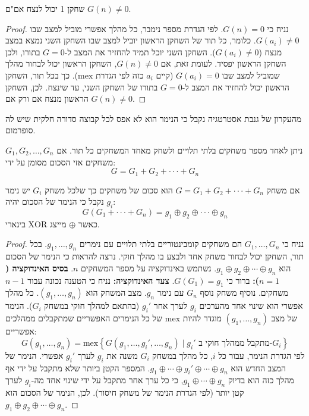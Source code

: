 \documentclass{tstextbook}
\begin{document}
\begin{proposition}
שחקן 1 יכול לנצח אם"ם \(G(n)\neq 0\).

\end{proposition}
\begin{proof}
נניח כי \(G(n)=0\). לפי הגדרת מספר נימבר, כל מהלך אפשרי מוביל למצב שבו \(G(a_{i})\neq 0\). כלומר, כל תור של השחקן הראשון יוביל למצב שבו השחקן השני נמצא במצב מנצח (\(G(a_{i})\neq 0\)). השחקן השני יוכל תמיד להחזיר את המצב ל-\(G=0\) בתורו, ולכן השחקן הראשון יפסיד.
לעומת זאת, אם \(G(n)\neq 0\), השחקן הראשון יכול לבחור מהלך שמוביל למצב שבו \(G(a_{i})=0\) (קיים \(a_{i}\) כזה לפי הגדרת \(\mathrm{mex}\)). כך בכל תור, השחקן הראשון יכול להחזיר את המצב ל-\(G=0\) בתורו של השחקן השני, עד שינצח.
לכן, השחקן הראשון מנצח אם ורק אם \(G(n)\neq 0\).

\end{proof}
\begin{proposition}
מהעקרון של גנבת אסטרטגיה נקבל כי הנימר הוא לא אפס לכל קבוצה סדורה חלקית שיש לה סופרמום.

\end{proposition}
\begin{definition}
ניתן לאחד מספר משחקים בלתי תלויים ולשחק מאחד המשחקים כל תור. אם \(G_{1},G_{2},\dots,G_{n}\) משחקים אזי הסכום מסומן על ידי:
$$G=G_{1}+G_{2}+\cdot\cdot\cdot+G_{n}$$

\end{definition}
\begin{proposition}
אם משחק \(G=G_{1}+G_{2}+\cdot\cdot\cdot+G_{n}\)  הוא סכום של משחקים כך שלכל משחק \(G_{i}\) יש נימר \(g_{i}\) נקבל כי הנימר של הסכום יהיה:
$$G(G_{1}+\cdot\cdot\cdot+G_{n})=g_{1}\oplus g_{2}\oplus\cdot\cdot\cdot\oplus g_{n}$$
כאשר \(\oplus\) מייצג \(\text{XOR}\) בינארי. 

\end{proposition}
\begin{proof}
נניח כי \(G_{1},\dots,G_{n}\) הם משחקים קומבינטוריים בלתי תלויים עם נימרים \(g_{1},\dots,g_{n}\). בכל תור, השחקן יכול לבחור משחק אחד ולבצע בו מהלך חוקי. נרצה להראות כי הנימר של הסכום הוא \(g_{1}\oplus g_{2}\oplus\cdots\oplus g_{n}\).
נשתמש באינדוקציה על מספר המשחקים \(n\).
\textbf{בסיס האינדוקציה (\(n=1\)):} ברור כי \(G(G_{1})=g_{1}\).
\textbf{צעד האינדוקציה:} נניח כי הטענה נכונה עבור \(n-1\) משחקים. נוסיף משחק נוסף \(G_{n}\) עם נימר \(g_{n}\). מצב המשחק הוא \((g_{1},\dots,g_{n})\). כל מהלך אפשרי הוא שינוי אחד מהערכים \(g_{i}\) לערך אחר \(g_{i}'\) (בהתאם למהלך חוקי במשחק \(G_{i}\)).
הנימר של מצב \((g_{1},\dots,g_{n})\) מוגדר להיות \(\mathrm{mex}\) של כל הנימרים האפשריים שמתקבלים ממהלכים אפשריים:
$$G(g_{1},\dots,g_{n}) = \mathrm{mex}\left\{ G(g_{1},\dots,g_{i}',\dots,g_{n}) \mid g_{i}' \text{ מתקבל ממהלך חוקי ב-} G_{i} \right\}
$$
לפי הגדרת הנימר, עבור כל \(i\), כל מהלך במשחק \(G_{i}\) משנה את \(g_{i}\) לערך \(g_{i}'\) אפשרי. הנימר של המצב החדש הוא \(g_{1}\oplus\cdots\oplus g_{i}'\oplus\cdots\oplus g_{n}\).
המספר הקטן ביותר שלא מתקבל על ידי אף מהלך כזה הוא בדיוק \(g_{1}\oplus\cdots\oplus g_{n}\), כי כל ערך אחר מתקבל על ידי שינוי אחד מה-\(g_{i}\) לערך קטן יותר (לפי הגדרת הנימר של משחק חיסור).
לכן, הנימר של הסכום הוא \(g_{1}\oplus g_{2}\oplus\cdots\oplus g_{n}\).

\end{proof}
\end{document}
